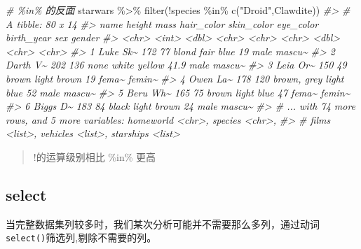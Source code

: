 \documentclass[
]{book}
\newenvironment{Shaded}{\begin{snugshade}}{\end{snugshade}}
\newcommand{\CommentTok}[1]{\textcolor[rgb]{0.56,0.35,0.01}{\textit{#1}}}
\newcommand{\FunctionTok}[1]{\textcolor[rgb]{0.00,0.00,0.00}{#1}}
\newcommand{\NormalTok}[1]{#1}
\newcommand{\SpecialCharTok}[1]{\textcolor[rgb]{0.00,0.00,0.00}{#1}}
\newcommand{\StringTok}[1]{\textcolor[rgb]{0.31,0.60,0.02}{#1}}
\begin{document}
\begin{Shaded}
\begin{Highlighting}[]
\CommentTok{\# \%in\% 的反面}
\NormalTok{starwars }\SpecialCharTok{\%\textgreater{}\%} 
  \FunctionTok{filter}\NormalTok{(}\SpecialCharTok{!}\NormalTok{species }\SpecialCharTok{\%in\%}  \FunctionTok{c}\NormalTok{(}\StringTok{"Droid"}\NormalTok{,}\StringTok{\textquotesingle{}Clawdite\textquotesingle{}}\NormalTok{))}
\CommentTok{\#\textgreater{} \# A tibble: 80 x 14}
\CommentTok{\#\textgreater{}   name     height  mass hair\_color  skin\_color eye\_color birth\_year sex   gender}
\CommentTok{\#\textgreater{}   \textless{}chr\textgreater{}     \textless{}int\textgreater{} \textless{}dbl\textgreater{} \textless{}chr\textgreater{}       \textless{}chr\textgreater{}      \textless{}chr\textgreater{}          \textless{}dbl\textgreater{} \textless{}chr\textgreater{} \textless{}chr\textgreater{} }
\CommentTok{\#\textgreater{} 1 Luke Sk\textasciitilde{}    172    77 blond       fair       blue            19   male  mascu\textasciitilde{}}
\CommentTok{\#\textgreater{} 2 Darth V\textasciitilde{}    202   136 none        white      yellow          41.9 male  mascu\textasciitilde{}}
\CommentTok{\#\textgreater{} 3 Leia Or\textasciitilde{}    150    49 brown       light      brown           19   fema\textasciitilde{} femin\textasciitilde{}}
\CommentTok{\#\textgreater{} 4 Owen La\textasciitilde{}    178   120 brown, grey light      blue            52   male  mascu\textasciitilde{}}
\CommentTok{\#\textgreater{} 5 Beru Wh\textasciitilde{}    165    75 brown       light      blue            47   fema\textasciitilde{} femin\textasciitilde{}}
\CommentTok{\#\textgreater{} 6 Biggs D\textasciitilde{}    183    84 black       light      brown           24   male  mascu\textasciitilde{}}
\CommentTok{\#\textgreater{} \# ... with 74 more rows, and 5 more variables: homeworld \textless{}chr\textgreater{}, species \textless{}chr\textgreater{},}
\CommentTok{\#\textgreater{} \#   films \textless{}list\textgreater{}, vehicles \textless{}list\textgreater{}, starships \textless{}list\textgreater{}}
\end{Highlighting}
\end{Shaded}

\begin{quote}
!的运算级别相比 \%in\% 更高
\end{quote}

\hypertarget{dplyr-select}{%
\subsection{select}\label{dplyr-select}}

当完整数据集列较多时，我们某次分析可能并不需要那么多列，通过动词\texttt{select()}筛选列,剔除不需要的列。
\end{document}
